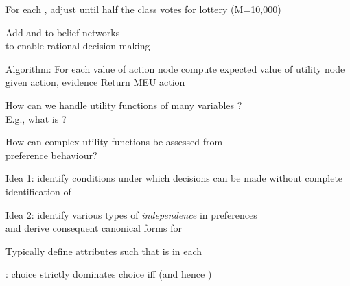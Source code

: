 \documentclass{article}
\begin{document}
\begin{huge}
For each , adjust  until half the class votes for lottery (M=10,000)

\vspace*{0.2in}

\textwidth
{}




Add  and  to belief networks\\
to enable rational decision making

\vspace*{0.2in}

\textwidth
{}

\vspace*{-0.4in}

Algorithm:\al
  For each value of action node\nl
    compute expected value of utility node given action, evidence\al
  Return MEU action



How can we handle utility functions of many variables ?\\
E.g., what is ?

How can complex utility functions be assessed from \\
preference behaviour?

Idea 1: identify conditions under which decisions can be made without
complete identification of 

Idea 2: identify various types of \emph{independence} in preferences\\
and derive consequent canonical forms for 


Typically define attributes such that  is  in each

: choice  strictly dominates choice  iff\nl
{} \quad (and hence )

\vspace*{0.2in}


\end{huge}
\end{document}
